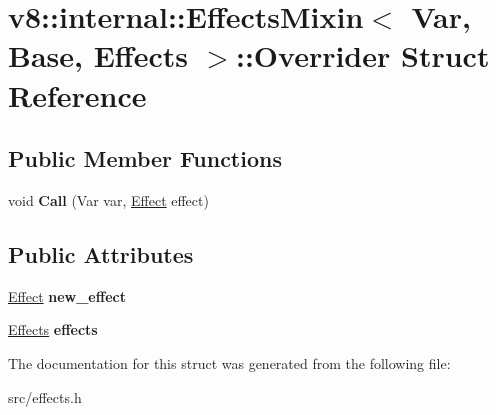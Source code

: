 \hypertarget{structv8_1_1internal_1_1_effects_mixin_1_1_overrider}{}\section{v8\+:\+:internal\+:\+:Effects\+Mixin$<$ Var, Base, Effects $>$\+:\+:Overrider Struct Reference}
\label{structv8_1_1internal_1_1_effects_mixin_1_1_overrider}
\subsection*{Public Member Functions}
\begin{DoxyCompactItemize}
\item 
\hypertarget{structv8_1_1internal_1_1_effects_mixin_1_1_overrider_a289d67b4f359bf08d7f95fd3b2bac728}{}void {\bfseries Call} (Var var, \hyperlink{structv8_1_1internal_1_1_effect}{Effect} effect)\label{structv8_1_1internal_1_1_effects_mixin_1_1_overrider_a289d67b4f359bf08d7f95fd3b2bac728}

\end{DoxyCompactItemize}
\subsection*{Public Attributes}
\begin{DoxyCompactItemize}
\item 
\hypertarget{structv8_1_1internal_1_1_effects_mixin_1_1_overrider_adc2797f3dd5b606f0326014fee540f5f}{}\hyperlink{structv8_1_1internal_1_1_effect}{Effect} {\bfseries new\+\_\+effect}\label{structv8_1_1internal_1_1_effects_mixin_1_1_overrider_adc2797f3dd5b606f0326014fee540f5f}

\item 
\hypertarget{structv8_1_1internal_1_1_effects_mixin_1_1_overrider_af11d1e55720d9381f427f0ffb6b01fab}{}\hyperlink{classv8_1_1internal_1_1_effects}{Effects} {\bfseries effects}\label{structv8_1_1internal_1_1_effects_mixin_1_1_overrider_af11d1e55720d9381f427f0ffb6b01fab}

\end{DoxyCompactItemize}


The documentation for this struct was generated from the following file\+:\begin{DoxyCompactItemize}
\item 
src/effects.\+h\end{DoxyCompactItemize}
